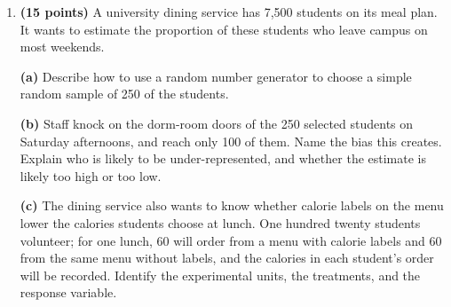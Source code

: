 \documentclass[12pt]{article}
\begin{document}
\begin{enumerate}[leftmargin=1.9em, itemsep=0.16in, resume]
        \vspace{6pt}
        \boxguard[17]
        \textbf{(e)} Use the residual plot to decide whether a linear model is appropriate for
        these data. Then explain why the homeowner should not use this line to predict the
        natural gas used on a 90$^\circ$F summer day.\\[4pt]

  \boxguard[26]
  \item \textbf{(15 points)} A university dining service has 7{,}500 students on its meal
        plan. It wants to estimate the proportion of these students who leave campus on most
        weekends.

        \vspace{6pt}
        \textbf{(a)} Describe how to use a random number generator to choose a simple random
        sample of 250 of the students.\\[4pt]

        \vspace{6pt}
        \boxguard[17]
        \textbf{(b)} Staff knock on the dorm-room doors of the 250 selected students on
        Saturday afternoons, and reach only 100 of them. Name the bias this creates. Explain
        who is likely to be under-represented, and whether the estimate is likely too high or
        too low.\\[4pt]

        \vspace{6pt}
        \boxguard[18]
        \textbf{(c)} The dining service also wants to know whether calorie labels on the menu
        lower the calories students choose at lunch. One hundred twenty students volunteer; for
        one lunch, 60 will order from a menu with calorie labels and 60 from the same menu
        without labels, and the calories in each student's order will be recorded. Identify the
        experimental units, the treatments, and the response variable.\\[4pt]


\end{enumerate}
\end{document}
